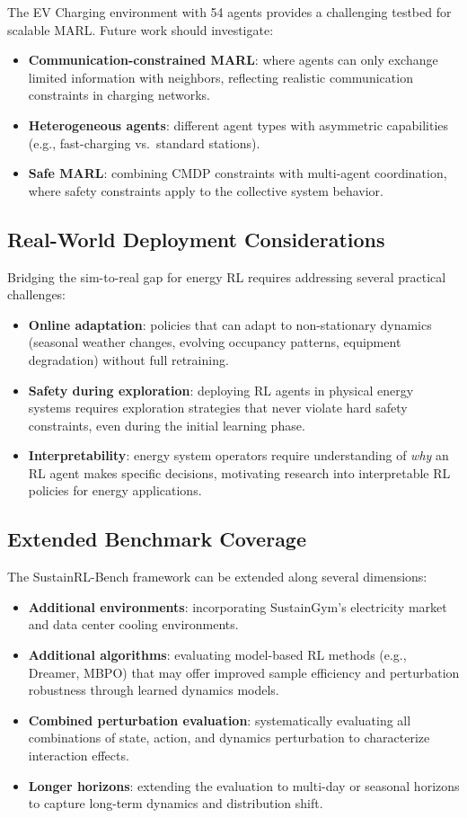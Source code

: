 The EV Charging environment with 54 agents provides a challenging testbed for scalable MARL. Future work should investigate:
\begin{itemize}
    \item \textbf{Communication-constrained MARL}: where agents can only exchange limited information with neighbors, reflecting realistic communication constraints in charging networks.
    \item \textbf{Heterogeneous agents}: different agent types with asymmetric capabilities (e.g., fast-charging vs.\ standard stations).
    \item \textbf{Safe MARL}: combining CMDP constraints with multi-agent coordination, where safety constraints apply to the collective system behavior.
\end{itemize}

\subsection{Real-World Deployment Considerations}

Bridging the sim-to-real gap for energy RL requires addressing several practical challenges:
\begin{itemize}
    \item \textbf{Online adaptation}: policies that can adapt to non-stationary dynamics (seasonal weather changes, evolving occupancy patterns, equipment degradation) without full retraining.
    \item \textbf{Safety during exploration}: deploying RL agents in physical energy systems requires exploration strategies that never violate hard safety constraints, even during the initial learning phase.
    \item \textbf{Interpretability}: energy system operators require understanding of \emph{why} an RL agent makes specific decisions, motivating research into interpretable RL policies for energy applications.
\end{itemize}

\subsection{Extended Benchmark Coverage}

The SustainRL-Bench framework can be extended along several dimensions:
\begin{itemize}
    \item \textbf{Additional environments}: incorporating SustainGym's electricity market and data center cooling environments.
    \item \textbf{Additional algorithms}: evaluating model-based RL methods (e.g., Dreamer, MBPO) that may offer improved sample efficiency and perturbation robustness through learned dynamics models.
    \item \textbf{Combined perturbation evaluation}: systematically evaluating all combinations of state, action, and dynamics perturbation to characterize interaction effects.
    \item \textbf{Longer horizons}: extending the evaluation to multi-day or seasonal horizons to capture long-term dynamics and distribution shift.
\end{itemize}

